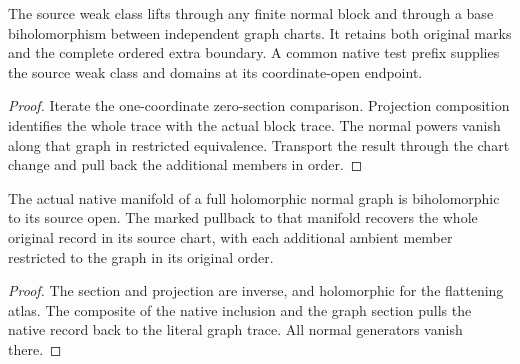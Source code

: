 \begin{theorem}
\label{hir:g1-finite-source-weak-graph-lift}
\leanok
The source weak class lifts through any finite normal block
and through a base biholomorphism between independent graph
charts. It retains both original marks and the complete
ordered extra boundary. A common native test prefix supplies
the source weak class and domains at its coordinate-open
endpoint.
\end{theorem}
\begin{proof}
Iterate the one-coordinate zero-section comparison. Projection
composition identifies the whole trace with the actual block
trace. The normal powers vanish along that graph in restricted
equivalence. Transport the result through the chart change
and pull back the additional members in order.
\end{proof}

\begin{theorem}
\label{hir:g1-finite-native-graph-record}
\leanok
The actual native manifold of a full holomorphic normal graph
is biholomorphic to its source open. The marked pullback to
that manifold recovers the whole original record in its source
chart, with each additional ambient member restricted to the
graph in its original order.
\end{theorem}
\begin{proof}
The section and projection are inverse, and holomorphic for
the flattening atlas. The composite of the native inclusion
and the graph section pulls the native record back to the
literal graph trace. All normal generators vanish there.
\end{proof}

